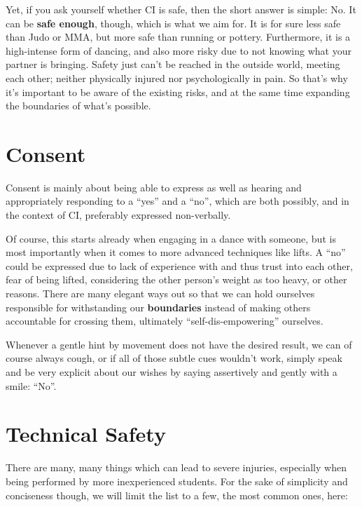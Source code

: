 Yet, if you ask yourself whether CI is safe, then the short answer is simple: No.
It can be \textbf{safe enough}, though, which is what we aim for.
It is for sure less safe than Judo or MMA, but more safe than running or pottery.
Furthermore, it is a high-intense form of dancing, and also more risky due to not knowing what your partner is bringing.
Safety just can't be reached in the outside world, meeting each other; neither physically injured nor psychologically in pain.
So that's why it's important to be aware of the existing risks, and at the same time expanding the boundaries of what's possible.

\section{Consent}\label{sec:consent}

Consent is mainly about being able to express as well as hearing and appropriately responding to a ``yes'' and a ``no'', which are both possibly, and in the context of CI, preferably expressed non-verbally.

Of course, this starts already when engaging in a dance with someone, but is most importantly when it comes to more advanced techniques like lifts.
A ``no'' could be expressed due to lack of experience with and thus trust into each other, fear of being lifted, considering the other person's weight as too heavy, or other reasons.
There are many elegant ways out so that we can hold ourselves responsible for withstanding our \textbf{boundaries} instead of making others accountable for crossing them, ultimately ``self-dis-empowering'' ourselves.

Whenever a gentle hint by movement does not have the desired result, we can of course always cough, or if all of those subtle cues wouldn't work, simply speak and be very explicit about our wishes by saying assertively and gently with a smile: ``No''.

\section{Technical Safety}\label{sec:technical-safety}

There are many, many things which can lead to severe injuries, especially when being performed by more inexperienced students.
For the sake of simplicity and conciseness though, we will limit the list to a few, the most common ones, here:

